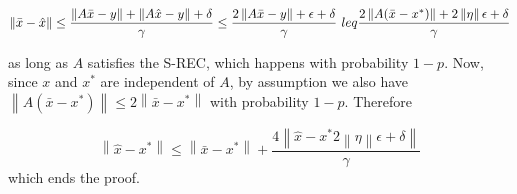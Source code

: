 \documentclass{article}
\newcommand\norm[1]{\left\lVert#1\right\rVert}
\theoremstyle{definition}
\theoremstyle{lemma}
\theoremstyle{theorem}
\begin{document}
$$ \norm{\Bar{x} - \hat{x}} \leq \frac{\norm{A\bar{x} - y} + \norm{A\hat{x} - y} + \delta}{\gamma} \leq \frac{
2\norm{A\bar{x} - y} + \epsilon + \delta}{\gamma} \ leq \frac{2\norm{A(\bar{x} - x^*)} + 2\norm{\eta} \epsilon + \delta}{\gamma} $$

as long as $A$ satisfies the S-REC, which happens with probability $1-p$.  Now, since $x$ and $x^*$ are independent of $A$, by assumption we also have $\norm{A(\bar{x} - x^*) } \leq 2 \norm{\bar{x} - x^*}$ with probability $1-p$. Therefore 

$$\norm{\hat{x} - x^*} \leq \norm{\bar{x} - x^*} + \frac{4 \norm{\hat{x} - x^*2\norm{\eta} \epsilon + \delta}}{\gamma}$$
which ends the proof.
\end{document}
